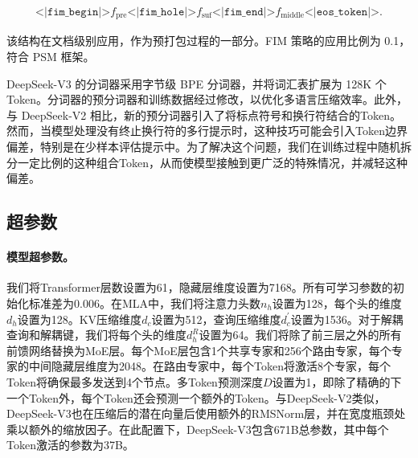 \documentclass[lang=cn,a4paper,newtx]{elegantpaper}
\newcommand{\dsvii}{DeepSeek-V2}
\newcommand{\dsattn}{MLA}
\newcommand{\dsviii}{DeepSeek-V3}
\begin{document}
\begin{align}
\texttt{<|fim\_begin|>}f_{\text{pre}}\texttt{<|fim\_hole|>}f_{\text{suf}}\texttt{<|fim\_end|>}f_{\text{middle}}\texttt{<|eos\_token|>} . \nonumber
\end{align}

该结构在文档级别应用，作为预打包过程的一部分。FIM 策略的应用比例为 0.1，符合 PSM 框架。

\dsviii{} 的分词器采用字节级 BPE 分词器，并将词汇表扩展为 128K 个Token。分词器的预分词器和训练数据经过修改，以优化多语言压缩效率。此外，与 \dsvii{} 相比，新的预分词器引入了将标点符号和换行符结合的Token。然而，当模型处理没有终止换行符的多行提示时，这种技巧可能会引入Token边界偏差，特别是在少样本评估提示中。为了解决这个问题，我们在训练过程中随机拆分一定比例的这种组合Token，从而使模型接触到更广泛的特殊情况，并减轻这种偏差。

\subsection{超参数}

\paragraph{模型超参数。}
我们将Transformer层数设置为61，隐藏层维度设置为7168。所有可学习参数的初始化标准差为0.006。在\dsattn{}中，我们将注意力头数$n_h$设置为128，每个头的维度$d_h$设置为128。KV压缩维度$d_c$设置为512，查询压缩维度$d_c^{\prime}$设置为1536。对于解耦查询和解耦键，我们将每个头的维度$d_h^R$设置为64。我们将除了前三层之外的所有前馈网络替换为MoE层。每个MoE层包含1个共享专家和256个路由专家，每个专家的中间隐藏层维度为2048。在路由专家中，每个Token将激活8个专家，每个Token将确保最多发送到4个节点。多Token预测深度$D$设置为1，即除了精确的下一个Token外，每个Token还会预测一个额外的Token。与\dsvii{}类似，\dsviii{}也在压缩后的潜在向量后使用额外的RMSNorm层，并在宽度瓶颈处乘以额外的缩放因子。在此配置下，\dsviii{}包含671B总参数，其中每个Token激活的参数为37B。
\end{document}
